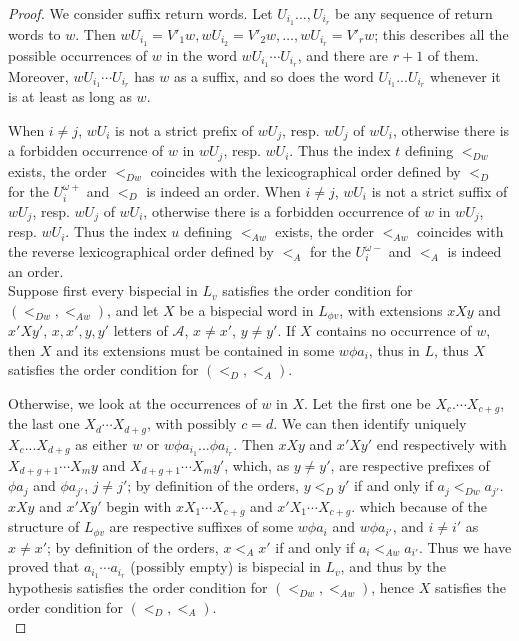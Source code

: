 \documentclass[12pt,a4paper]{amsart}
\begin{document}
\begin{proof}
We consider suffix return words. Let $U_{i_1}\ldots ,U_{i_r}$ be any sequence of  return words to $w$. Then  $wU_{i_1}=V'_1w, wU_{i_2}=V'_2w, \ldots, wU_{i_r}=V'_rw$; this describes
all the possible occurrences of $w$ in the word
 $wU_{i_1}\cdots U_{i_r}$, and there are $r+1$ of them. Moreover,  $wU_{i_1}\cdots U_{i_r}$ has $w$ as a suffix, and so does the word
 $U_{i_1}...U_{i_r}$  whenever it is at least as long as $w$.

 When $i\neq j$, $wU_i$ is not a strict prefix of $wU_j$, resp.  $wU_j$ of $wU_i$, otherwise there is a forbidden occurrence of $w$ in $wU_j$, resp. $wU_i.$ Thus the index $t$ defining $<_{Dw}$ exists, the order $<_ {Dw}$ coincides with the lexicographical order defined by $<_D$ for the $U_i^{\omega+}$  
 and $<_D$ is indeed an order.    When $i\neq j$, $wU_i$ is not a strict suffix of $wU_j$, resp.  $wU_j$ of $wU_i$, otherwise there is a forbidden occurrence of $w$ in $wU_j$, resp. $wU_i.$ Thus the index $u$ defining  $<_{Aw}$ exists,  the order $<_ {Aw}$ coincides with the reverse lexicographical order defined by $<_A$ for the $U_i^{\omega-}$  
and $<_A$ is indeed an order.   \\


 



Suppose first every  bispecial in $L_v$ satisfies the order condition for $(<_{Dw},<_{Aw})$, and let $X$ be a bispecial word in  $L_{\phi v}$, with extensions $xXy$ and $x'Xy'$, $x,x',y,y'$ letters of $\mathcal A$, $x\neq x'$, $y\neq y'$. 
 If $X$ contains no occurrence of $w$, then 
$X$ and its extensions must be contained in some $w\phi a_i$, thus in $L$, thus $X$ satisfies the order condition for $(<_D,<_A)$. 

Otherwise, we look at the occurrences of $w$ in $X$. Let the first one be $X_c.\cdots X_{c+g}$, the last one $X_d\cdots X_{d+g}$, with possibly $c=d$. We can then identify uniquely $X_{c}...X_{d+g}$ as either $w$ or
 $w\phi a_{i_1}...\phi a_{i_r}$.
Then $xXy$ and $x'Xy'$
end respectively with $X_{d+g+1}\cdots X_my$ and $X_{d+g+1}\cdots X_my'$, which, as $y\neq  y'$,  are respective prefixes of $\phi a_j$ and  $\phi a_{j'}$, $j\neq j'$; by definition of the orders, $y<_D y'$ if and only if $a_{j}<_{Dw} a_{j'}$. 
$xXy$ and $x'Xy'$
begin with $xX_{1}\cdots X_{c+g}$ and  $x'X_{1}\cdots X_{c+g}$. which because of the structure of $L_{\phi v}$ are respective suffixes of some $w\phi a_i$ and $w\phi a_{i'}$, and $i\neq i'$ as $x\neq x'$; by definition of the orders,  $x<_A x'$ if and only if $a_i<_{Aw} a_{i'}$. Thus we have proved that $a_{i_1}\cdots a_{i_r}$
 (possibly empty) is  bispecial in $L_v$, and  thus by the hypothesis satisfies the order condition for $(<_{Dw},<_{Aw})$, hence $X$ satisfies the order condition for $(<_D,<_A)$.\\


\end{proof}
\end{document}
